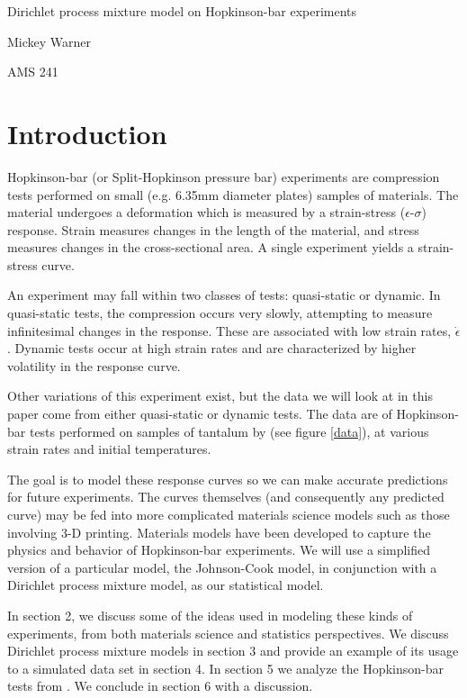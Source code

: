 \documentclass[12pt]{article}
\begin{document}
\begin{LARGE}
\noindent Dirichlet process mixture model on Hopkinson-bar experiments
\end{LARGE}
\bigskip

\noindent Mickey Warner

\noindent AMS 241

\section{Introduction}

Hopkinson-bar (or Split-Hopkinson pressure bar) experiments are compression tests performed on small (e.g. 6.35mm diameter plates) samples of materials. The material undergoes a deformation which is measured by a strain-stress ($\epsilon$-$\sigma$) response. Strain measures changes in the length of the material, and stress measures changes in the cross-sectional area. A single experiment yields a strain-stress curve.

An experiment may fall within two classes of tests: quasi-static or dynamic. In quasi-static tests, the compression occurs very slowly, attempting to measure infinitesimal changes in the response. These are associated with low strain rates, $\dot\epsilon$. Dynamic tests occur at high strain rates and are characterized by higher volatility in the response curve.

Other variations of this experiment exist, but the data we will look at in this paper come from either quasi-static or dynamic tests. The data are of Hopkinson-bar tests performed on samples of tantalum by \cite{chen1996constitutive} (see figure \ref{data}), at various strain rates and initial temperatures.

The goal is to model these response curves so we can make accurate predictions for future experiments. The curves themselves (and consequently any predicted curve) may be fed into more complicated materials science models such as those involving 3-D printing. Materials models have been developed to capture the physics and behavior of Hopkinson-bar experiments. We will use a simplified version of a particular model, the Johnson-Cook model, in conjunction with a Dirichlet process mixture model, as our statistical model.

In section 2, we discuss some of the ideas used in modeling these kinds of experiments, from both materials science and statistics perspectives. We discuss Dirichlet process mixture models in section 3 and provide an example of its usage to a simulated data set in section 4. In section 5 we analyze the Hopkinson-bar tests from \cite{chen1996constitutive}. We conclude in section 6 with a discussion.
\end{document}
